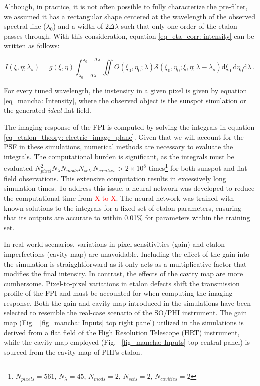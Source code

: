 Although, in practice, it is not often possible to fully characterize the pre-filter, we assumed it has a rectangular shape centered at the wavelength of the observed spectral line ($\lambda _ {0}$) and a width of $2\Delta \lambda$ such that only one order of the etalon passes through. With this consideration, equation \eqref{eq_eta_corr: intensity} can be written as follows:

\begin{equation}
  I\left(\xi, \eta ; \lambda_{s}\right)=g(\xi, \eta)\int_{\lambda _ 0 - \Delta \lambda}^{\lambda _ 0 - \Delta \lambda} \iint  O\left(\xi_0, \eta_0 ; \lambda\right)  \mathcal{S}\left(\xi_0, \eta_0; \xi , \eta; \lambda-\lambda_{s}\right)  \mathrm{d} \xi_{0} \mathrm{~d} \eta_{0}\mathrm{d} \lambda \ .
  \label{eq_mancha: Intensity}
\end{equation}

For every tuned wavelength, the instensity in a given pixel is given by equation \eqref{eq_mancha: Intensity}, where the observed object is the sunspot simulation or the generated \textit{ideal} flat-field. 

The imaging response of the FPI is computed by solving the integrals in equation \eqref{eq_etalon_theory: electric_image_plane}. Given that we will account for the PSF in these simulations, numerical methods are necessary to evaluate the integrals. The computational burden is significant, as the integrals must be evaluated $N_{pixel} ^2 N_{\lambda} N_{mods} N_{sets} N_{cavities} > 2\times10 ^8$ times\footnote{$N_{pixels} = 561$, $N_{\lambda} = 45$, $N_{mods} = 2$, $N_{sets} = 2$, $N_{cavities} = 2$} for both sunspot and flat field observations. This extensive computation results in excessively long simulation times. To address this issue, a neural network was developed to reduce the computational time from \textcolor{red}{X to X}. The neural network was trained with known solutions to the integrals for a fixed set of etalon parameters, ensuring that its outputs are accurate to within 0.01\% for parameters within the training set.

In real-world scenarios, variations in pixel sensitivities (gain) and etalon imperfections (cavity map) are unavoidable. Including the effect of the gain into the simulation is straigghtforward as it only acts as a multiplicative factor that modifies the final intensity. In contrast, the effects of the cavity map are more cumbersome. Pixel-to-pixel variations in etalon defects shift the transmission profile of the FPI and must be accounted for when computing the imaging response. Both the gain and cavity map introduced in the simulations have been selected to resemble the real-case scenario of the SO/PHI instrument. The gain map (Fig. ~\ref{fig_mancha: Inputs} top right panel) utilized in the simulations is derived from a flat field of the High Resolution Telescope (HRT) instrument, while the cavity map employed (Fig. ~\ref{fig_mancha: Inputs} top central panel) is sourced from the cavity map of PHI's etalon.


